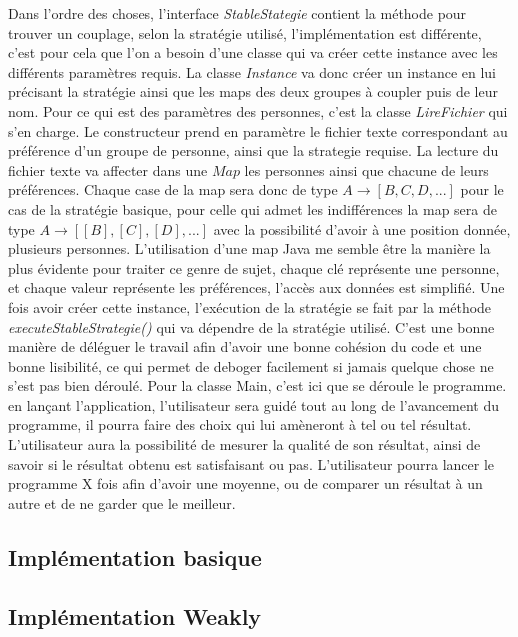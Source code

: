\documentclass[11pt]{article}
\begin{document}
Dans l'ordre des choses, l'interface \emph{StableStategie} contient la méthode pour trouver un couplage, selon la stratégie utilisé, l’implémentation est différente, c'est pour cela que l'on a besoin d'une classe qui va créer cette instance avec les différents paramètres requis. La classe \emph{Instance} va donc créer un instance en lui précisant la stratégie ainsi que les maps des deux groupes à coupler puis de leur nom. Pour ce qui est des paramètres des personnes, c'est la classe \emph{LireFichier} qui s'en charge. Le constructeur prend en paramètre le fichier texte correspondant au préférence d'un groupe de personne, ainsi que la strategie requise. La lecture du fichier texte va affecter dans une $Map$ les personnes ainsi que chacune de leurs préférences. Chaque case de la map sera donc de type $A \rightarrow [B, C, D, ...]$ pour le cas de la stratégie basique, pour celle qui admet les indifférences la map sera de type $A \rightarrow [[B], [C], [D], ...]$ avec la possibilité d'avoir à une position donnée, plusieurs personnes. L'utilisation d'une map Java me semble être la manière la plus évidente pour traiter ce genre de sujet, chaque clé représente une personne, et chaque valeur représente les préférences, l’accès aux données est simplifié. Une fois avoir créer cette instance, l’exécution de la stratégie se fait par la méthode \emph{executeStableStrategie()} qui va dépendre de la stratégie utilisé. C'est une bonne manière de déléguer le travail afin d'avoir une bonne cohésion du code et une bonne lisibilité, ce qui permet de deboger facilement si jamais quelque chose ne s'est pas bien déroulé. Pour la classe Main, c'est ici que se déroule le programme. en lançant l'application, l'utilisateur sera guidé tout au long de l'avancement du programme, il pourra faire des choix qui lui amèneront à tel ou tel résultat. L'utilisateur aura la possibilité de mesurer la qualité de son résultat, ainsi de savoir si le résultat obtenu est satisfaisant ou pas. L'utilisateur pourra lancer le programme X fois afin d'avoir une moyenne, ou de comparer un résultat à un autre et de ne garder que le meilleur. 



\subsection{Implémentation basique}
\subsection{Implémentation Weakly}
\end{document}

